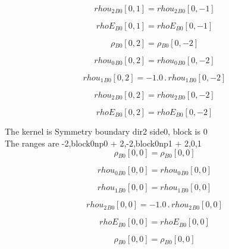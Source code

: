 \documentclass{article}
\begin{document}
\begin{dmath}{rhou_{2}{_{B0}}}[{0,1}] = {rhou_{2}{_{B0}}}[{0,-1}]\end{dmath}

\begin{dmath}{rhoE{_{B0}}}[{0,1}] = {rhoE{_{B0}}}[{0,-1}]\end{dmath}

\begin{dmath}{\rho{_{B0}}}[{0,2}] = {\rho{_{B0}}}[{0,-2}]\end{dmath}

\begin{dmath}{rhou_{0}{_{B0}}}[{0,2}] = {rhou_{0}{_{B0}}}[{0,-2}]\end{dmath}

\begin{dmath}{rhou_{1}{_{B0}}}[{0,2}] = - 1.0 \,.\, {rhou_{1}{_{B0}}}[{0,-2}]\end{dmath}

\begin{dmath}{rhou_{2}{_{B0}}}[{0,2}] = {rhou_{2}{_{B0}}}[{0,-2}]\end{dmath}

\begin{dmath}{rhoE{_{B0}}}[{0,2}] = {rhoE{_{B0}}}[{0,-2}]\end{dmath}

\noindent The kernel is Symmetry boundary dir2 side0, block is 0\\\noindent The ranges are -2,block0np0 + 2,-2,block0np1 + 2,0,1\\\begin{dmath}{\rho{_{B0}}}[{0,0}] = {\rho{_{B0}}}[{0,0}]\end{dmath}

\begin{dmath}{rhou_{0}{_{B0}}}[{0,0}] = {rhou_{0}{_{B0}}}[{0,0}]\end{dmath}

\begin{dmath}{rhou_{1}{_{B0}}}[{0,0}] = {rhou_{1}{_{B0}}}[{0,0}]\end{dmath}

\begin{dmath}{rhou_{2}{_{B0}}}[{0,0}] = - 1.0 \,.\, {rhou_{2}{_{B0}}}[{0,0}]\end{dmath}

\begin{dmath}{rhoE{_{B0}}}[{0,0}] = {rhoE{_{B0}}}[{0,0}]\end{dmath}

\begin{dmath}{\rho{_{B0}}}[{0,0}] = {\rho{_{B0}}}[{0,0}]\end{dmath}
\end{document}

